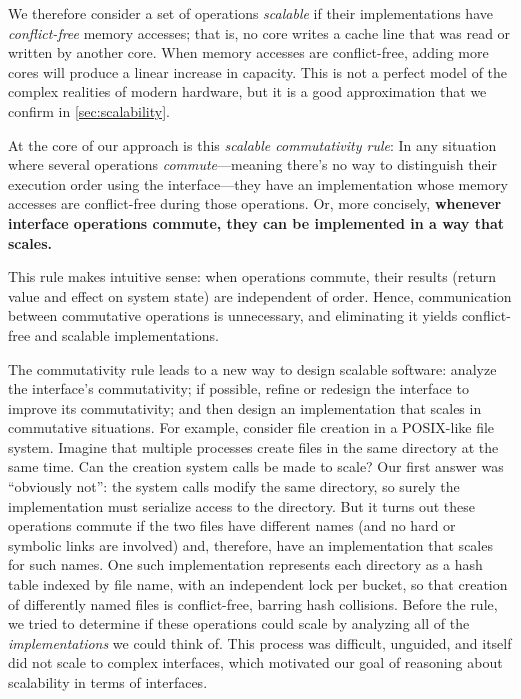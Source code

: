 We therefore consider a set of operations \emph{scalable} if their
implementations have \emph{conflict-free} memory accesses; that is, no
core writes a cache line that was read or written by another core.
%
When memory accesses are conflict-free, adding more cores will produce
a linear increase in capacity.
%
This is not a perfect model of the complex realities of modern
hardware, but it is a good approximation that we confirm in
\cref{sec:scalability}.

At the core of our approach is this \emph{scalable commutativity
  rule}: In any situation where several operations
\emph{commute}---meaning there's no way to distinguish their execution
order using the interface---they have an implementation whose memory
accesses are conflict-free during those operations.
%
Or, more concisely, \textbf{whenever interface operations commute,
  they can be implemented in a way that scales.}

This rule makes intuitive sense: when operations commute, their
results (return value and effect on system state) are independent of
order.  Hence, communication between commutative operations is
unnecessary, and eliminating it yields conflict-free and scalable
implementations.

The commutativity rule leads to a new way to design scalable
software:
%
analyze the interface's commutativity; if possible, refine or redesign
the interface to improve its commutativity; and then design an
implementation that scales in commutative situations.
%
For example,
consider file creation in a POSIX-like file system. Imagine that
multiple processes create files in the same directory at the same
time. Can the creation system calls be made to scale? Our
first answer was ``obviously not'': the system calls modify the same
directory, so surely the implementation must
serialize access to the directory. But it turns
out these operations commute if the two files have different names
(and no hard or symbolic links are involved) and, therefore, have an
implementation that scales for such names.
One such implementation represents each directory as a hash table
indexed by file name, with an independent lock per bucket,
so that creation of differently named files is conflict-free, barring
hash collisions.
%
Before the rule, we tried to determine if these
operations could scale by analyzing all of the \emph{implementations}
we could think
of.  This process was difficult, unguided, and itself did not scale to
complex interfaces, which
motivated our goal of reasoning about
scalability in terms of interfaces.


